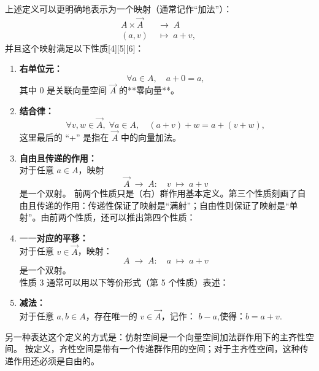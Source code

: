 上述定义可以更明确地表示为一个映射（通常记作“加法”）：
$$
\begin{aligned}
A \times \overrightarrow{A} &\;\longrightarrow\; A \\
(a, v) &\;\longmapsto\; a + v,
\end{aligned}~
$$
并且这个映射满足以下性质[4][5][6]：
\begin{enumerate}
\item \textbf{右单位元：}\\
$$
\forall a \in A, \quad a + 0 = a,~
$$
其中 $0$ 是关联向量空间 $\overrightarrow{A}$ 的**零向量**。
\item \textbf{结合律：}\\
$$
\forall v, w \in \overrightarrow{A},\; \forall a \in A, \quad (a + v) + w = a + (v + w),~
$$
这里最后的 “+” 是指在 $\overrightarrow{A}$ 中的向量加法。
\item \textbf{自由且传递的作用：}\\
对于任意 $a \in A$，映射
$$
\overrightarrow{A} \;\longrightarrow\; A: \quad v \;\longmapsto\; a + v~
$$
是一个双射。
前两个性质只是（右）群作用基本定义。第三个性质刻画了自由且传递的作用：传递性保证了映射是“满射”；自由性则保证了映射是“单射”。由前两个性质，还可以推出第四个性质：
\item 一一\textbf{对应的平移：}\\
对于任意 $v \in \overrightarrow{A}$，映射：
$$
A \;\longrightarrow\; A: \quad a \;\mapsto\; a + v~
$$
是一个双射。\\
性质 3 通常可以用以下等价形式（第 5 个性质）表述：\\
\item \textbf{减法：}\\
对于任意 $a, b \in A$，存在唯一的 $v \in \overrightarrow{A}$，记作：
$b - a$,使得：$b = a + v$.
\end{enumerate}
另一种表达这个定义的方式是：仿射空间是一个向量空间加法群作用下的主齐性空间。
按定义，齐性空间是带有一个传递群作用的空间；对于主齐性空间，这种传递作用还必须是自由的。
